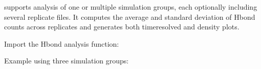 \documentclass[a4paper,10pt,english]{sphinxmanual}
\begin{document}
\sphinxAtStartPar
{} supports analysis of one or multiple simulation groups, each optionally including several replicate files. It computes the average and standard deviation of H\sphinxhyphen{}bond counts across replicates and generates both time\sphinxhyphen{}resolved and density plots.

\sphinxAtStartPar
{}

\sphinxAtStartPar
Import the H\sphinxhyphen{}bond analysis function:

\begin{sphinxVerbatim}[commandchars=\\\{\}]
 
\end{sphinxVerbatim}

\sphinxAtStartPar
Example using three simulation groups:
\end{document}
